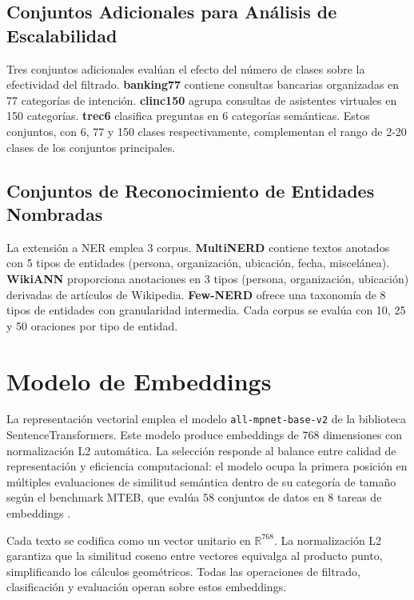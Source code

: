 \subsection{Conjuntos Adicionales para Análisis de Escalabilidad}

Tres conjuntos adicionales evalúan el efecto del número de clases sobre la efectividad del filtrado. \textbf{banking77} contiene consultas bancarias organizadas en 77 categorías de intención. \textbf{clinc150} agrupa consultas de asistentes virtuales en 150 categorías. \textbf{trec6} clasifica preguntas en 6 categorías semánticas. Estos conjuntos, con 6, 77 y 150 clases respectivamente, complementan el rango de 2-20 clases de los conjuntos principales.

\subsection{Conjuntos de Reconocimiento de Entidades Nombradas}

La extensión a NER emplea 3 corpus. \textbf{MultiNERD} contiene textos anotados con 5 tipos de entidades (persona, organización, ubicación, fecha, miscelánea). \textbf{WikiANN} proporciona anotaciones en 3 tipos (persona, organización, ubicación) derivadas de artículos de Wikipedia. \textbf{Few-NERD} ofrece una taxonomía de 8 tipos de entidades con granularidad intermedia. Cada corpus se evalúa con 10, 25 y 50 oraciones por tipo de entidad.

\section{Modelo de Embeddings}
\label{sec:modelo_embeddings}

La representación vectorial emplea el modelo \texttt{all-mpnet-base-v2} de la biblioteca SentenceTransformers. Este modelo produce embeddings de 768 dimensiones con normalización L2 automática. La selección responde al balance entre calidad de representación y eficiencia computacional: el modelo ocupa la primera posición en múltiples evaluaciones de similitud semántica dentro de su categoría de tamaño según el benchmark MTEB, que evalúa 58 conjuntos de datos en 8 tareas de embeddings \cite{muennighoff2023mteb}.

Cada texto se codifica como un vector unitario en $\mathbb{R}^{768}$. La normalización L2 garantiza que la similitud coseno entre vectores equivalga al producto punto, simplificando los cálculos geométricos. Todas las operaciones de filtrado, clasificación y evaluación operan sobre estos embeddings.

